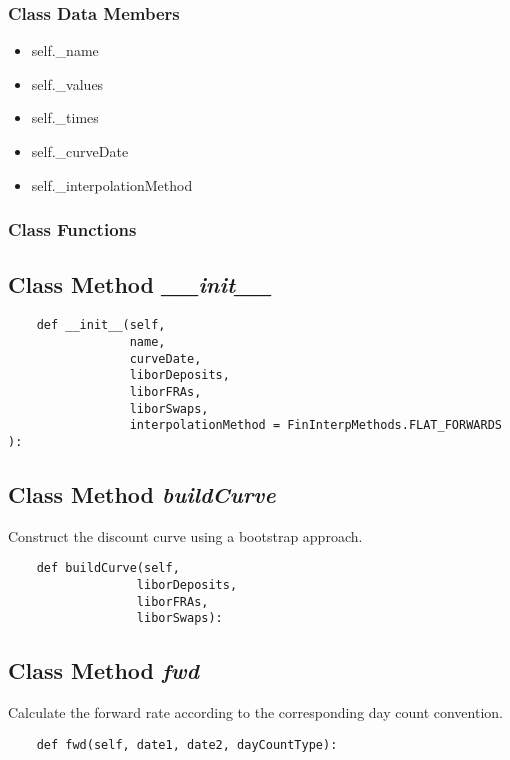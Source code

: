 \documentclass[twoside,11pt]{book}
\begin{document}
\subsubsection{Class Data Members}
\begin{itemize}
\item{self.\_name}
\item{self.\_values}
\item{self.\_times}
\item{self.\_curveDate}
\item{self.\_interpolationMethod}
\end{itemize}

\subsubsection{Class Functions}

\subsection{Class Method {\it \_\_init\_\_}}


\begin{lstlisting}
    def __init__(self, 
                 name, 
                 curveDate, 
                 liborDeposits,
                 liborFRAs,
                 liborSwaps,
                 interpolationMethod = FinInterpMethods.FLAT_FORWARDS ):
\end{lstlisting}

\subsection{Class Method {\it buildCurve}}
Construct the discount curve using a bootstrap approach. 

\begin{lstlisting}
    def buildCurve(self,
                  liborDeposits,
                  liborFRAs,
                  liborSwaps):
\end{lstlisting}

\subsection{Class Method {\it fwd}}
Calculate the forward rate according to the corresponding day count convention. 

\begin{lstlisting}
    def fwd(self, date1, date2, dayCountType):
\end{lstlisting}
\end{document}
